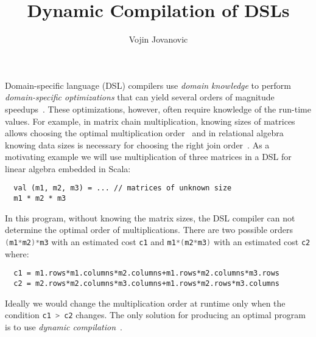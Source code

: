 \documentclass{llncs}
\newcommand{\scode}[1]{\lstinline[language=Scala,columns=fixed,basicstyle=\ttfamily,keywordstyle=\ttfamily]|#1|}
\newcommand{\code}[1]{\scode{#1}}
\begin{document}
\title{Dynamic Compilation of DSLs}

\author{Vojin Jovanovic}

\maketitle

Domain-specific language (DSL) compilers use \emph{domain knowledge} to perform
 \emph{domain-specific optimizations} that can yield several orders of magnitude speedups~\cite{rompf_optimizing_2013}.
 These optimizations, however, often require knowledge of the run-time values. For example,
 in matrix chain multiplication, knowing sizes of matrices allows choosing the
 optimal multiplication order~\cite[Ch.~15.2]{cormen2001introduction} and
 in relational algebra knowing data sizes is necessary for choosing the right join order~\cite{selinger1979access}.
 As a motivating example we will use multiplication of three matrices in a DSL for linear algebra
 embedded in Scala:
\vspace{0.5em}
\begin{lstlisting}
  val (m1, m2, m3) = ... // matrices of unknown size
  m1 * m2 * m3
\end{lstlisting}
\vspace{0.5em}

In this program, without knowing the matrix sizes, the DSL compiler can not determine the
 optimal order of multiplications. There are two possible orders
 \code{(m1*m2)*m3} with an estimated cost \code{c1} and \code{m1*(m2*m3)} with an estimated cost \code{c2} where:
 \vspace{0.5em}
\begin{lstlisting}
  c1 = m1.rows*m1.columns*m2.columns+m1.rows*m2.columns*m3.rows
  c2 = m2.rows*m2.columns*m3.columns+m1.rows*m2.rows*m3.columns
\end{lstlisting}
\vspace{0.5em}
Ideally we would change the multiplication order at runtime only when the condition \code{c1 > c2} changes.
The only solution for producing an optimal program is to use \emph{dynamic compilation}~\cite{auslander1996fast}.
\end{document}
